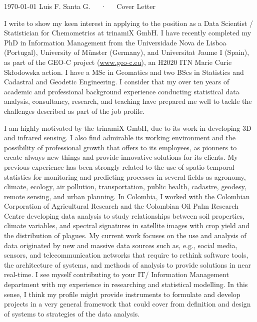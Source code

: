 \documentclass[11pt, a4paper]{awesome-cv}
\begin{document}
\makecvheader[R]

\makecvfooter
  {\today}
    {Luis F. Santa G.~~~·~~~Cover Letter}
  {}

\makelettertitle

\begin{cvletter}
I write to show my keen interest in applying to the position as a Data Scientist / Statistician for Chemometrics at trinamiX GmbH. I have recently completed my PhD in Information Management from the Universidade Nova de Lisboa (Portugal), University of Münster (Germany), and Universitat Jaume I (Spain), as part of the GEO-C project (\url{www.geo-c.eu}), an H2020 ITN Marie Curie Skłodowska action. I have a MSc in Geomatics and two BScs in Statistics and Cadastral and Geodetic Engineering. I consider that my over ten years of academic and professional background experience conducting statistical data analysis, consultancy, research, and teaching have prepared me well to tackle the challenges described as part of the job profile.\par
I am highly motivated by the trinamiX GmbH, due to its work in developing 3D and infrared sensing. I also find admirable its working environment and the possibility of professional growth that offers to its employees, as pionners to create always new things and provide innovative solutions for its clients. My previous experience has been strongly related to the use of spatio-temporal statistics for monitoring and predicting processes in several fields as agronomy, climate, ecology, air pollution, transportation, public health, cadastre, geodesy, remote sensing, and urban planning. In Colombia, I worked with the Colombian Corporation of Agricultural Research and the Colombian Oil Palm Research Centre developing data analysis to study relationships between soil properties, climate variables, and spectral signatures in satellite images with crop yield and the distribution of plagues. My current work focuses on the use and analysis of data originated by new and massive data sources such as, e.g., social media, sensors, and telecommunication networks that require to rethink software tools, the architecture of systems, and methods of analysis to provide solutions in near real-time. I see myself contributing to your IT/ Information Management department with my experience in researching and statistical modelling. In this sense, I think my profile might provide instruments to formulate and develop projects in a very general framework that could cover from definition and design of systems to strategies of the data analysis.\par

\end{cvletter}
\end{document}
